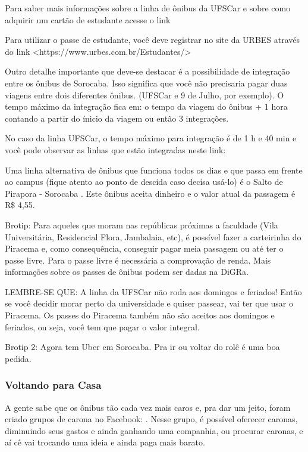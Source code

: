 Para saber mais informações sobre a linha de ônibus da UFSCar e sobre como adquirir um cartão de estudante acesse o link 

Para utilizar o passe de estudante, você deve registrar no site da URBES através do link <https://www.urbes.com.br/Estudantes/>

Outro detalhe importante que deve-se destacar é a possibilidade de integração entre os ônibus de Sorocaba. Isso significa que você não precisaria pagar duas viagens entre dois diferentes ônibus. (UFSCar e 9 de Julho, por exemplo). O tempo máximo da integração fica em: o tempo da viagem do ônibus + 1 hora contando a partir do ínicio da viagem ou então 3 integrações. 

No caso da linha UFSCar, o tempo máximo para integração é de 1 h e 40 min e você pode observar as linhas que estão integradas neste link: 

Uma linha alternativa de ônibus que funciona todos os dias e que passa em frente ao campus (fique atento ao ponto de descida caso decisa usá-lo) é o Salto de Pirapora - Sorocaba . Este ônibus aceita dinheiro e o valor atual da passagem é R\$ 4,55.

Brotip: Para aqueles que moram nas repúblicas próximas a faculdade (Vila Universitária, Residencial Flora, Jambalaia, etc), é possível fazer a carteirinha do Piracema e, como consequência, conseguir pagar meia passagem ou até ter o passe livre. Para o passe livre é necessária a comprovação de renda. Mais informações sobre os passes de ônibus podem ser dadas na DiGRa.

LEMBRE-SE QUE: A linha da UFSCar não roda aos domingos e feriados! Então se você decidir morar perto da universidade e quiser passear, vai ter que usar o Piracema. Os passes do Piracema também não são aceitos aos domingos e feriados, ou seja, você tem que pagar o valor integral.

Brotip 2: Agora tem Uber em Sorocaba. Pra ir ou voltar do rolê é uma boa pedida. 

\subsubsection{Voltando para Casa}
A gente sabe que os ônibus tão cada vez mais caros e, pra dar um jeito, foram
criado grupos de carona no Facebook:
. Nesse grupo, é possível oferecer caronas, diminuindo seus gastos e ainda ganhando uma companhia, ou procurar caronas, e aí cê vai trocando uma ideia e ainda paga mais barato.


